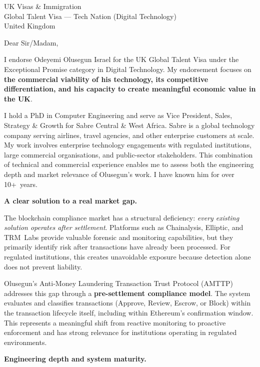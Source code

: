 \documentclass[12pt,a4paper]{letter}
\date{8 March 2026}
\begin{document}
\begin{letter}{UK Visas \& Immigration\\
Global Talent Visa --- Tech Nation (Digital Technology)\\
United Kingdom}

\opening{Dear Sir/Madam,}

I endorse Odeyemi Olusegun Israel for the UK Global Talent Visa under
the Exceptional Promise category in Digital Technology.  My endorsement
focuses on \textbf{the commercial viability of his technology, its
competitive differentiation, and his capacity to create meaningful
economic value in the UK}.

I hold a PhD in Computer Engineering and serve as Vice President,
Sales, Strategy \& Growth for Sabre Central \& West Africa.  Sabre is a
global technology company serving airlines, travel agencies, and other
enterprise customers at scale.  My work involves enterprise technology
engagements with regulated institutions, large commercial organisations,
and public-sector stakeholders.  This combination of technical and
commercial experience enables me to assess both the engineering depth and
market relevance of Olusegun's work.  I have known him for over
10+~years.


\textbf{A clear solution to a real market gap.}

The blockchain compliance market has a structural deficiency:
\textit{every existing solution operates after settlement}.
Platforms such as Chainalysis, Elliptic, and TRM~Labs provide valuable
forensic and monitoring capabilities, but they primarily identify risk
after transactions have already been processed.  For regulated
institutions, this creates unavoidable exposure because detection alone
does not prevent liability.

Olusegun's Anti-Money Laundering Transaction Trust Protocol (AMTTP)
addresses this gap through a \textbf{pre-settlement compliance model}.
The system evaluates and classifies transactions (Approve, Review,
Escrow, or Block) within the transaction lifecycle itself, including
within Ethereum's confirmation window.  This represents a meaningful
shift from reactive monitoring to proactive enforcement and has strong
relevance for institutions operating in regulated environments.


\textbf{Engineering depth and system maturity.}


\end{letter}
\end{document}
